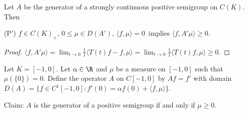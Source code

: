 \begin{lemma}\label{lem:b2-1.21}
Let $A$ be the generator of a strongly continuous positive semigroup on $C(K)$.
Then 

(P') \quad $f \in C(K)_{+}$,  $0 \leq \mu \in D(A')$,  $\langle f,\mu \rangle = 0$\, implies  $\langle f,A'\mu \rangle \geq 0$.
\end{lemma}
\begin{proof}
$\langle f,A'\mu \rangle = \lim_{t \to 0} \frac{1}{t} \langle T(t)f - f, \mu \rangle = \lim_{t \to 0} \frac{1}{t} \langle T(t)f, \mu \rangle \geq 0$.
\end{proof}
\begin{example}\label{ex:b2-1.22}
Let $K = [-1,0]$.
Let $\alpha \in \R$ and $\mu$ be a measure on $[-1,0]$ such that $\mu(\{0\}) = 0$.
Define the operator $A$ on $C[-1,0]$ by $Af = f'$ with domain $D(A) = \{f \in C^{1}[-1,0] \colon f'(0) = \alpha f(0) + \langle f,\mu \rangle\}$.

Claim: $A$ is the generator of a positive semigroup if and only if\/ $\mu \geq 0$.
\end{example}
